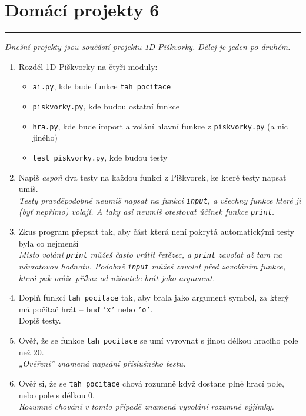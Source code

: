 \documentclass[a4paper,10pt]{article}
\newcommand\plsetno{6}
\newcommand\startsection[1]{
     \vspace{0.2ex}
    \hrule
    {\fontspec{Oxygen} \tiny
     \vspace{-1ex}
     \emph{#1}
     \vspace{-1.5em}
    }
}
\begin{document}
\section*{Domácí projekty \plsetno}

\startsection{Dnešní projekty jsou součástí projektu 1D Piškvorky. Dělej je jeden po druhém.}

\begin{enumerate}
\item Rozděl 1D Piškvorky na čtyři moduly:
    \begin{itemize}
        \item \texttt{ai.py}, kde bude funkce \texttt{tah\_pocitace}
        \item \texttt{piskvorky.py}, kde budou ostatní funkce
        \item \texttt{hra.py}, kde bude import a volání hlavní funkce z \texttt{piskvorky.py} (a nic jiného)
        \item \texttt{test\_piskvorky.py}, kde budou testy
    \end{itemize}

\item Napiš \emph{aspoň} dva testy na každou funkci z Piškvorek, ke které testy napsat umíš.
    \\\emph{\small Testy pravděpodobně neumíš napsat na funkci \texttt{input}, a všechny funkce které ji (byť nepřímo) volají.
            A taky asi neumíš otestovat účinek funkce \texttt{print}.}

\item Zkus program přepsat tak, aby část která není pokrytá automatickými testy byla co nejmenší
    \\\emph{\small Místo volání \texttt{print} můžeš často vrátit řetězec,
            a \texttt{print} zavolat až tam na návratovou hodnotu.
            Podobně \texttt{input} můžeš zavolat před zavoláním funkce,
            která pak může příkaz od uživatele brát jako argument.}

\item Doplň funkci \texttt{tah\_pocitace} tak, aby brala jako argument symbol, za který má počítač hrát – buď \texttt{'x'} nebo \texttt{'o'}.
    \\Dopiš testy.

\item Ověř, že se funkce \texttt{tah\_pocitace} se umí vyrovnat s jinou délkou hracího pole než 20.
    \\\emph{\small „Ověření” znamená napsání příslušného testu.}

\item Ověř si, že se \texttt{tah\_pocitace} chová rozumně když dostane plné hrací pole, nebo pole s délkou 0.
    \\\emph{\small Rozumné chování v tomto případě znamená vyvolání rozumné výjimky.}

\end{enumerate}
\end{document}
